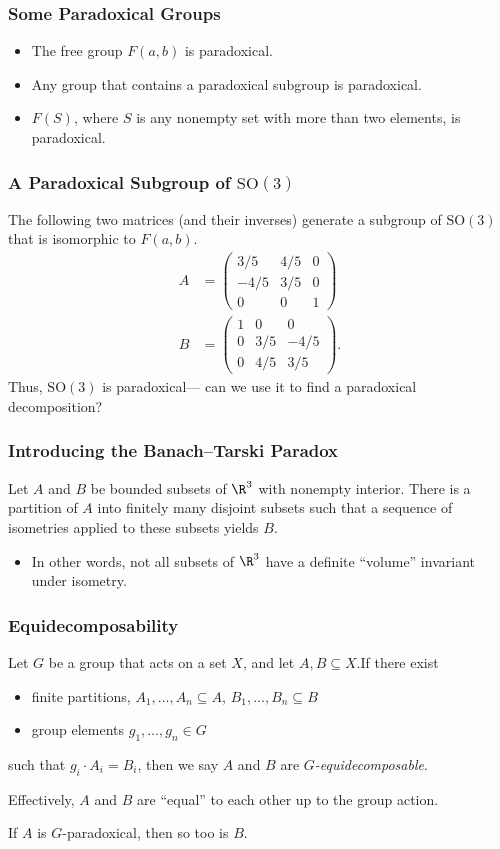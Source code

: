 \documentclass{beamer-custom}
\begin{document}
\begin{frame}
  \frametitle{Some Paradoxical Groups}
  \begin{itemize}
    \item The free group $F(a,b)$ is paradoxical.\pause
    \item Any group that contains a paradoxical subgroup is paradoxical.\pause
    \item $F(S)$, where $S$ is any nonempty set with more than two elements, is paradoxical.
  \end{itemize}
\end{frame}
\begin{frame}
  \frametitle{A Paradoxical Subgroup of $\text{SO}(3)$}
  The following two matrices (and their inverses) generate a subgroup of $\text{SO}(3)$ that is isomorphic to $F(a,b)$.
  \begin{align*}
    A &= \begin{pmatrix}3/5 & 4/5 & 0 \\  -4/5 & 3/5 & 0 \\ 0 & 0 & 1\end{pmatrix}\\
    B &= \begin{pmatrix}1 & 0 & 0 \\ 0 & 3/5 & -4/5 \\ 0 & 4/5 & 3/5\end{pmatrix}.
  \end{align*}\pause
  Thus, $\text{SO}(3)$ is paradoxical\pause\:--- can we use it to find a paradoxical decomposition?
\end{frame}
\begin{frame}
  \frametitle{Introducing the Banach--Tarski Paradox}
  \begin{theorem}
    Let $A$ and $B$ be bounded subsets of $\R^3$ with nonempty interior. There is a partition of $A$ into finitely many disjoint subsets such that a sequence of isometries applied to these subsets yields $B$.
  \end{theorem}\pause
  \begin{itemize}
    \item In other words, not all subsets of $\R^3$ have a definite ``volume'' invariant under isometry.
  \end{itemize}
\end{frame}
\begin{frame}
  \frametitle{Equidecomposability}
  Let $G$ be a group that acts on a set $X$, and let $A,B\subseteq X$.\pause\:If there exist
  \begin{itemize}
    \item finite partitions, $A_1,\dots,A_n\subseteq A$, $B_1,\dots,B_n\subseteq B$
    \item group elements $g_1,\dots,g_n\in G$
  \end{itemize}
  such that $g_i\cdot A_i = B_i$, then we say $A$ and $B$ are \textit{$G$-equidecomposable}.\pause\newline

  Effectively, $A$ and $B$ are ``equal'' to each other up to the group action.\pause\newline

  If $A$ is $G$-paradoxical, then so too is $B$.
\end{frame}
\end{document}
